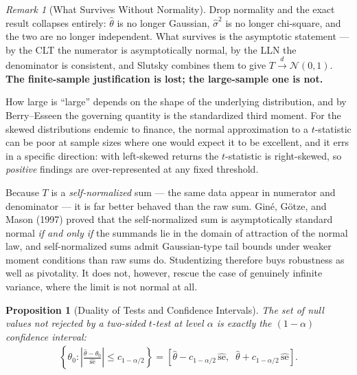 \documentclass[11pt]{article}
\theoremstyle{definition}
\theoremstyle{plain}
\newtheorem{proposition}{Proposition}[section]
\theoremstyle{remark}
\newtheorem{remark}{Remark}[section]
\begin{document}
\begin{remark}[What Survives Without Normality]
    Drop normality and the exact result collapses entirely: $\hat{\theta}$ is no longer Gaussian, $\hat{\sigma}^2$ is no longer chi-square, and the two are no longer independent. What survives is the asymptotic statement --- by the CLT the numerator is asymptotically normal, by the LLN the denominator is consistent, and Slutsky combines them to give $T \xrightarrow{d}\mathcal{N}(0,1)$. \textbf{The finite-sample justification is lost; the large-sample one is not.}

    How large is ``large'' depends on the shape of the underlying distribution, and by Berry--Esseen the governing quantity is the standardized third moment. For the skewed distributions endemic to finance, the normal approximation to a $t$-statistic can be poor at sample sizes where one would expect it to be excellent, and it errs in a specific direction: with left-skewed returns the $t$-statistic is right-skewed, so \emph{positive} findings are over-represented at any fixed threshold.

    Because $T$ is a \emph{self-normalized} sum --- the same data appear in numerator and denominator --- it is far better behaved than the raw sum. Gin\'e, G\"otze, and Mason (1997) proved that the self-normalized sum is asymptotically standard normal \emph{if and only if} the summands lie in the domain of attraction of the normal law, and self-normalized sums admit Gaussian-type tail bounds under weaker moment conditions than raw sums do. Studentizing therefore buys robustness as well as pivotality. It does not, however, rescue the case of genuinely infinite variance, where the limit is not normal at all.
\end{remark}

\begin{proposition}[Duality of Tests and Confidence Intervals]
    The set of null values not rejected by a two-sided $t$-test at level $\alpha$ is exactly the $(1-\alpha)$ confidence interval:
    \begin{align}
        \left\{\theta_0 : \left|\frac{\hat{\theta}-\theta_0}{\widehat{\mathrm{se}}}\right| \leq c_{1-\alpha/2}\right\}
        = \left[\hat{\theta} - c_{1-\alpha/2}\,\widehat{\mathrm{se}},\;\; \hat{\theta} + c_{1-\alpha/2}\,\widehat{\mathrm{se}}\right].
    \end{align}
\end{proposition}
\end{document}
